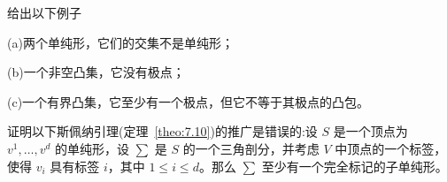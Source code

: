\bigskip
\noindent
\begin{exercise}\label{exer:7.3}
给出以下例子

(a)两个单纯形，它们的交集不是单纯形；

(b)一个非空凸集，它没有极点；

(c)一个有界凸集，它至少有一个极点，但它不等于其极点的凸包。
\end{exercise}

\bigskip
\noindent
\begin{exercise}\label{exer:7.4}
证明以下斯佩纳引理(定理~\ref{theo:7.10})的推广是错误的:设 \(S\) 是一个顶点为 \({v}^{1},\ldots,{v}^{d}\) 的单纯形，设 \(\sum\) 是 \(S\) 的一个三角剖分，并考虑 \(V\) 中顶点的一个标签，使得 \({v}_{i}\) 具有标签 \(i\)，其中 \(1 \leq  i \leq  d\)。那么 \(\sum\) 至少有一个完全标记的子单纯形。

\end{exercise}
